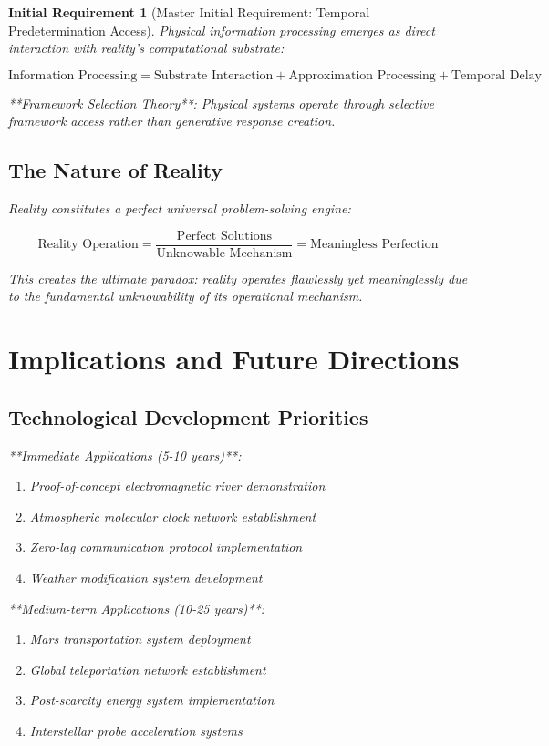 \documentclass[12pt,a4paper]{article}
\newtheorem{requirement}[theorem]{Initial Requirement}
\theoremstyle{remark}
\begin{document}
\begin{requirement}[Master Initial Requirement: Temporal Predetermination Access]
Physical information processing emerges as direct interaction with reality's computational substrate:

\begin{equation}
\text{Information Processing} = \text{Substrate Interaction} + \text{Approximation Processing} + \text{Temporal Delay}
\end{equation}

**Framework Selection Theory**: Physical systems operate through selective framework access rather than generative response creation.

\subsection{The Nature of Reality}

Reality constitutes a perfect universal problem-solving engine:

\begin{equation}
\text{Reality Operation} = \frac{\text{Perfect Solutions}}{\text{Unknowable Mechanism}} = \text{Meaningless Perfection}
\end{equation}

This creates the ultimate paradox: reality operates flawlessly yet meaninglessly due to the fundamental unknowability of its operational mechanism.

\section{Implications and Future Directions}

\subsection{Technological Development Priorities}

**Immediate Applications (5-10 years)**:
\begin{enumerate}
\item Proof-of-concept electromagnetic river demonstration
\item Atmospheric molecular clock network establishment
\item Zero-lag communication protocol implementation
\item Weather modification system development
\end{enumerate}

**Medium-term Applications (10-25 years)**:
\begin{enumerate}
\item Mars transportation system deployment
\item Global teleportation network establishment
\item Post-scarcity energy system implementation
\item Interstellar probe acceleration systems
\end{enumerate}


\end{requirement}
\end{document}
